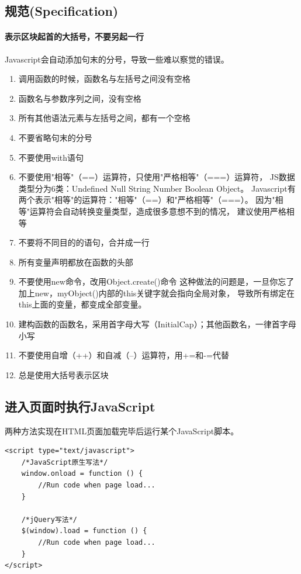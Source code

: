 \documentclass{book}
\begin{document}
\subsection{规范(Specification)}

\paragraph{表示区块起首的大括号，不要另起一行}

Javascript会自动添加句末的分号，导致一些难以察觉的错误。

\begin{enumerate}
\setcounter{enumi}{0}
\item{调用函数的时候，函数名与左括号之间没有空格}
\item{函数名与参数序列之间，没有空格}
\item{所有其他语法元素与左括号之间，都有一个空格}
\item{不要省略句末的分号}
\item{不要使用with语句}
\item{不要使用"相等"（==）运算符，只使用"严格相等"（===）运算符，
JS数据类型分为6类：Undefined Null String Number Boolean Object。
Javascript有两个表示"相等"的运算符："相等"（==）和"严格相等"（===）。
因为"相等"运算符会自动转换变量类型，造成很多意想不到的情况，
建议使用严格相等}
\item{不要将不同目的的语句，合并成一行}
\item{所有变量声明都放在函数的头部}
\item{不要使用new命令，改用Object.create()命令}
这种做法的问题是，一旦你忘了加上new，myObject()内部的this关键字就会指向全局对象，
导致所有绑定在this上面的变量，都变成全部变量。
\item{建构函数的函数名，采用首字母大写（InitialCap）；其他函数名，一律首字母小写}
\item{不要使用自增（++）和自减（--）运算符，用+=和-=代替}
\item{总是使用大括号表示区块}
\end{enumerate}

\subsection{进入页面时执行JavaScript}

两种方法实现在HTML页面加载完毕后运行某个JavaScript脚本。

\begin{lstlisting}[language=VBSCript]
<script type="text/javascript">
	/*JavaScript原生写法*/    
    window.onload = function () {
        //Run code when page load...
    }
    
    /*jQuery写法*/
    $(window).load = function () {
    	//Run code when page load...
    }
</script>
\end{lstlisting}
\end{document}
